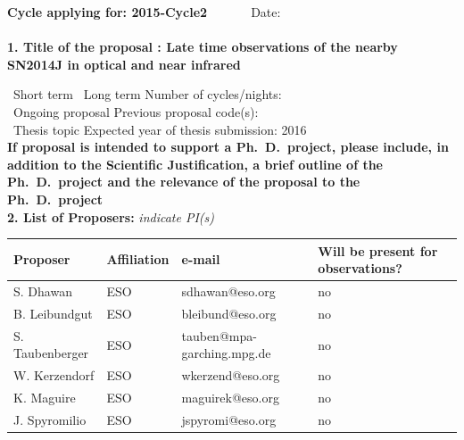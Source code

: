 \documentclass[11pt]{article}
\begin{document}


{\bf Cycle applying for: 2015-Cycle2}~~~~~~~\hfil Date: \hfil\\
%
%
\\
{\bf 1. Title of the proposal : Late time observations of the nearby SN2014J in optical  and near infrared} 

%
\NO~Short term \hfil \NO~Long term \hfil Number of cycles/nights: ~~~~\hfil\\
\NO~Ongoing proposal \hfil Previous proposal code(s):~~~~~~~~~~~~~\hfil~~~~\\
\YES~Thesis topic \hfil Expected year of thesis submission: 2016  \hfil~~~\\
{\bf \small {If proposal is intended to support a Ph.\ D.\ project, please
include, in addition to the Scientific Justification, a brief outline of the 
Ph.\ D.\ project and the relevance of the proposal to the Ph.\ D.\ project}}\\

%
%
{\bf 2. List of Proposers: } {\sl indicate PI(s)}\\[1mm]
\begin{tabular}{|p{2in}|p{2in}|p{1.5in}|p{0.8in}|}
\hline
Proposer & Affiliation & e-mail & Will be present for observations?\\
\hline
S. Dhawan& ESO & sdhawan@eso.org& no\\ \hline
 B. Leibundgut & ESO &bleibund@eso.org & no\\ \hline
S. Taubenberger & ESO & tauben@mpa-garching.mpg.de & no\\ \hline
W. Kerzendorf & ESO & wkerzend@eso.org & no\\ \hline
K. Maguire & ESO & maguirek@eso.org & no\\ \hline
J. Spyromilio & ESO & jspyromi@eso.org & no\\ \hline
\end{tabular}
\end{document}
